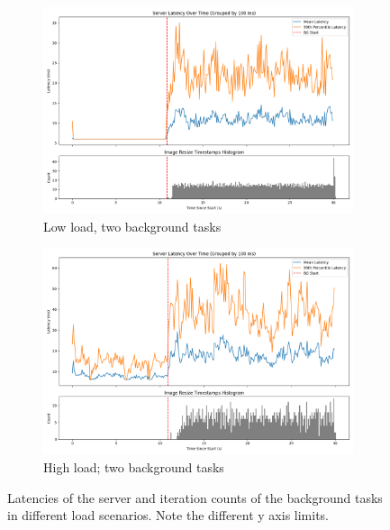\begin{figure}[t]
    \centering
    \begin{subfigure}[t]{0.48\textwidth}
        \includegraphics[width=\textwidth]{graphs/unedited-weight-low-two.png}
        \caption{Low load, two background tasks}\label{fig:unedited-weight-low-two}
    \end{subfigure}
    \hspace{\fill}
    \begin{subfigure}[t]{0.48\textwidth}
        \includegraphics[width=\textwidth]{graphs/unedited-weight-high-two.png}
        \caption{High load; two background tasks}\label{fig:unedited-weight-high-two}
    \end{subfigure}
    \caption{Latencies of the server and iteration counts of the background
    tasks in different load scenarios. Note the different y axis limits.}
\end{figure}

